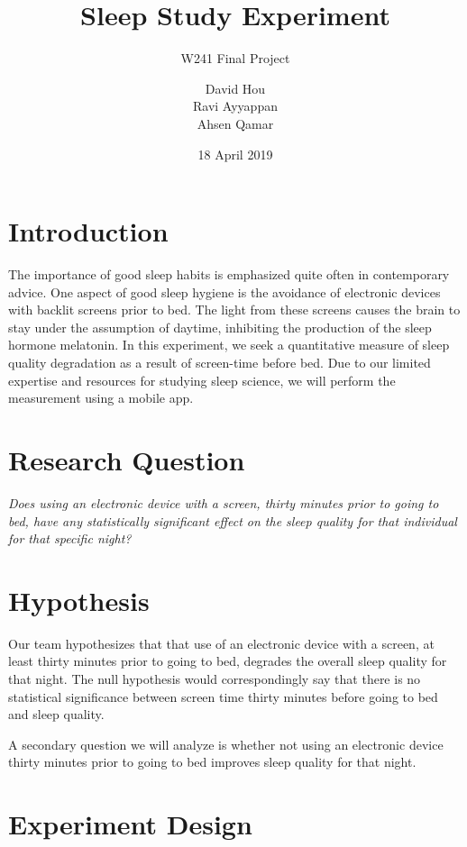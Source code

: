 \documentclass[12pt,]{article}
\title{Sleep Study Experiment}
\subtitle{W241 Final Project}
\author{David Hou \\ Ravi Ayyappan \\ Ahsen Qamar}
\date{18 April 2019}
\begin{document}
\maketitle

\hypertarget{introduction}{%
\section{Introduction}\label{introduction}}

The importance of good sleep habits is emphasized quite often in
contemporary advice. One aspect of good sleep hygiene is the avoidance
of electronic devices with backlit screens prior to bed. The light from
these screens causes the brain to stay under the assumption of daytime,
inhibiting the production of the sleep hormone melatonin. In this
experiment, we seek a quantitative measure of sleep quality degradation
as a result of screen-time before bed. Due to our limited expertise and
resources for studying sleep science, we will perform the measurement
using a mobile app.

\hypertarget{research-question}{%
\section{Research Question}\label{research-question}}

\emph{Does using an electronic device with a screen, thirty minutes
prior to going to bed, have any statistically significant effect on the
sleep quality for that individual for that specific night?}

\hypertarget{hypothesis}{%
\section{Hypothesis}\label{hypothesis}}

Our team hypothesizes that that use of an electronic device with a
screen, at least thirty minutes prior to going to bed, degrades the
overall sleep quality for that night. The null hypothesis would
correspondingly say that there is no statistical significance between
screen time thirty minutes before going to bed and sleep quality.

A secondary question we will analyze is whether not using an electronic
device thirty minutes prior to going to bed improves sleep quality for
that night.

\hypertarget{experiment-design}{%
\section{Experiment Design}\label{experiment-design}}
\end{document}
